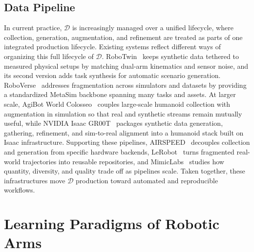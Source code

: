 \documentclass[acmsmall,screen,review]{acmart}
\begin{document}
\subsection{Data Pipeline}\label{sec:data_factories_robotic_arms}

In current practice, \(\mathcal{D}\) is increasingly managed over a unified lifecycle, where collection, generation, augmentation, and refinement are treated as parts of one integrated production lifecycle.
Existing systems reflect different ways of organizing this full lifecycle of \(\mathcal{D}\). 
RoboTwin~\cite{mu2025robotwin} keeps synthetic data tethered to measured physical setups by matching dual-arm kinematics and sensor noise, and its second version adds task synthesis for automatic scenario generation. 
RoboVerse~\cite{geng2025roboverse} addresses fragmentation across simulators and datasets by providing a standardized MetaSim backbone spanning many tasks and assets. 
At larger scale, AgiBot World Colosseo~\cite{agibot2025} couples large-scale humanoid collection with augmentation in simulation so that real and synthetic streams remain mutually useful, 
while NVIDIA Isaac GR00T~\cite{nvidia_gr00t} packages synthetic data generation, gathering, refinement, and sim-to-real alignment into a humanoid stack built on Isaac infrastructure. 
Supporting these pipelines, AIRSPEED~\cite{xia2024airspeed} decouples collection and generation from specific hardware backends, 
LeRobot~\cite{lerobot2024} turns fragmented real-world trajectories into reusable repositories, 
and MimicLabs~\cite{saxena2025matters} studies how quantity, diversity, and quality trade off as pipelines scale.
Taken together, these infrastructures move \(\mathcal{D}\) production toward automated and reproducible workflows.

\section{Learning Paradigms of Robotic Arms}\label{sec:embodiment_method}
\end{document}
